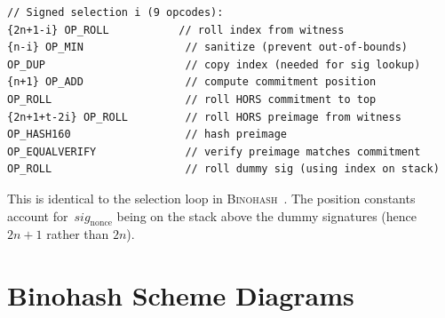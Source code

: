 \documentclass[11pt, a4paper]{article}
\begin{document}
\begin{lstlisting}[language={}, numbers=none]
// Signed selection i (9 opcodes):
{2n+1-i} OP_ROLL           // roll index from witness
{n-i} OP_MIN                // sanitize (prevent out-of-bounds)
OP_DUP                      // copy index (needed for sig lookup)
{n+1} OP_ADD                // compute commitment position
OP_ROLL                     // roll HORS commitment to top
{2n+1+t-2i} OP_ROLL         // roll HORS preimage from witness
OP_HASH160                  // hash preimage
OP_EQUALVERIFY              // verify preimage matches commitment
OP_ROLL                     // roll dummy sig (using index on stack)
\end{lstlisting}

\noindent This is identical to the selection loop in \textsc{Binohash}~\cite[Appendix~B]{linus2024binohash}. The position constants account for~$\mathit{sig}_{\mathrm{nonce}}$ being on the stack above the dummy signatures (hence $2n + 1$ rather than $2n$).

\section{Binohash Scheme Diagrams}
\label{app:binohash-diagrams}
\end{document}

